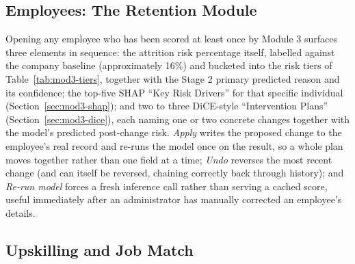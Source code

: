 \documentclass[11pt,a4paper]{article}
\begin{document}
\subsection{Employees: The Retention Module}

Opening any employee who has been scored at least once by Module 3 surfaces three elements in sequence: the attrition risk percentage itself, labelled against the company baseline (approximately 16\%) and bucketed into the risk tiers of Table~\ref{tab:mod3-tiers}, together with the Stage 2 primary predicted reason and its confidence; the top-five SHAP ``Key Risk Drivers'' for that specific individual (Section~\ref{sec:mod3-shap}); and two to three DiCE-style ``Intervention Plans'' (Section~\ref{sec:mod3-dice}), each naming one or two concrete changes together with the model's predicted post-change risk. \emph{Apply} writes the proposed change to the employee's real record and re-runs the model once on the result, so a whole plan moves together rather than one field at a time; \emph{Undo} reverses the most recent change (and can itself be reversed, chaining correctly back through history); and \emph{Re-run model} forces a fresh inference call rather than serving a cached score, useful immediately after an administrator has manually corrected an employee's details.

\subsection{Upskilling and Job Match}
\end{document}
